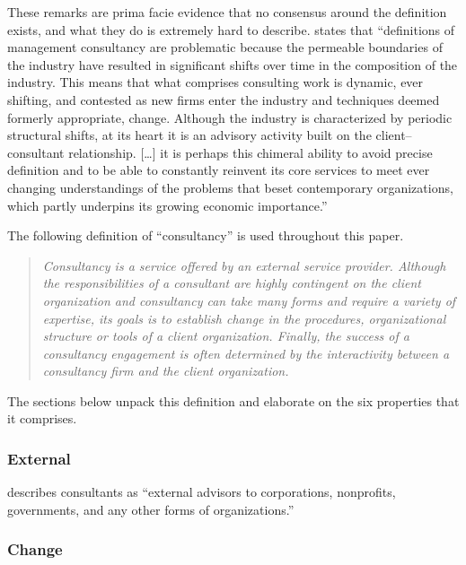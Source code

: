 \documentclass[12pt]{article}
\begin{document}
These remarks are prima facie evidence that no consensus around the
definition exists, and what they do is extremely hard to describe.
\citet[24]{kipping2012} states that ``definitions of management
consultancy are problematic because the permeable boundaries of the
industry have resulted in significant shifts over time in the
composition of the industry. This means that what comprises consulting
work is dynamic, ever shifting, and contested as new firms enter the
industry and techniques deemed formerly appropriate, change. Although
the industry is characterized by periodic structural shifts, at its
heart it is an advisory activity built on the client--consultant
relationship. {[}\ldots{]} it is perhaps this chimeral ability to avoid
precise definition and to be able to constantly reinvent its core
services to meet ever changing understandings of the problems that beset
contemporary organizations, which partly underpins its growing economic
importance.''

The following definition of ``consultancy'' is used throughout this
paper.

\begin{quote}
\emph{Consultancy is a service offered by an external service provider.
Although the responsibilities of a consultant are highly contingent on
the client organization and consultancy can take many forms and require
a variety of expertise, its goals is to establish change in the
procedures, organizational structure or tools of a client organization.
Finally, the success of a consultancy engagement is often determined by
the interactivity between a consultancy firm and the client
organization.}
\end{quote}

The sections below unpack this definition and elaborate on the six
properties that it comprises.

\hypertarget{external}{%
\subsubsection{External}\label{external}}

\citet[138]{chowdhury2021} describes consultants as ``external advisors
to corporations, nonprofits, governments, and any other forms of
organizations.''

\hypertarget{change}{%
\subsubsection{Change}\label{change}}
\end{document}
